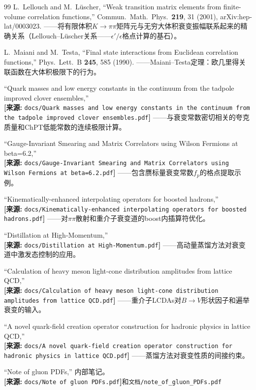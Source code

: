 \documentclass[12pt,a4paper]{ctexart}
\theoremstyle{definition}
\begin{document}
\begin{thebibliography}{99}
L.~Lellouch and M.~L\"uscher,
``Weak transition matrix elements from finite-volume correlation functions,''
Commun.\ Math.\ Phys.\ \textbf{219}, 31 (2001), arXiv:hep-lat/0003023.
——将有限体积$K\to\pi\pi$矩阵元与无穷大体积衰变振幅联系起来的精确关系（Lellouch--L\"uscher关系——$\epsilon'/\epsilon$格点计算的基石）。

L.~Maiani and M.~Testa,
``Final state interactions from Euclidean correlation functions,''
Phys.\ Lett.\ B \textbf{245}, 585 (1990).
——Maiani--Testa定理：欧几里得关联函数在大体积极限下的行为。

``Quark masses and low energy constants in the continuum from the tadpole improved clover ensembles,''
\\\textbf{[来源:} \texttt{docs/Quark masses and low energy constants in the continuum from the tadpole improved clover ensembles.pdf}\textbf{]}
——与衰变常数密切相关的夸克质量和ChPT低能常数的连续极限计算。

``Gauge-Invariant Smearing and Matrix Correlators using Wilson Fermions at beta=6.2,''
\\\textbf{[来源:} \texttt{docs/Gauge-Invariant Smearing and Matrix Correlators using Wilson Fermions at beta=6.2.pdf}\textbf{]}
——包含赝标量衰变常数$f_p$的格点提取示例。

``Kinematically-enhanced interpolating operators for boosted hadrons,''
\\\textbf{[来源:} \texttt{docs/Kinematically-enhanced interpolating operators for boosted hadrons.pdf}\textbf{]}
——对$\pi\pi$散射和重介子衰变道的boost内插算符优化。

``Distillation at High-Momentum,''
\\\textbf{[来源:} \texttt{docs/Distillation at High-Momentum.pdf}\textbf{]}
——高动量蒸馏方法对衰变道中激发态控制的应用。

``Calculation of heavy meson light-cone distribution amplitudes from lattice QCD,''
\\\textbf{[来源:} \texttt{docs/Calculation of heavy meson light-cone distribution amplitudes from lattice QCD.pdf}\textbf{]}
——重介子LCDAs对$B\to V$形状因子和遍举衰变的输入。

``A novel quark-field creation operator construction for hadronic physics in lattice QCD,''
\\\textbf{[来源:} \texttt{docs/A novel quark-field creation operator construction for hadronic physics in lattice QCD.pdf}\textbf{]}
——蒸馏方法对衰变性质的间接约束。

``Note of gluon PDFs,'' 内部笔记。
\\\textbf{[来源:} \texttt{docs/Note of gluon PDFs.pdf}\textbf{]}和\texttt{文档/note\_of\_gluon\_PDFs.pdf}

\end{thebibliography}
\end{document}
